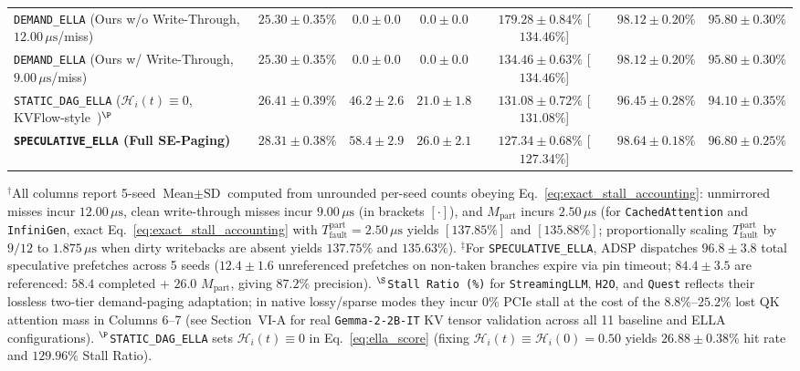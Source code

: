 \documentclass[conference,10pt]{IEEEtran}
\begin{document}
\begin{table}[t]
{\begin{tabular}{@{}lcccccc@{}}
\texttt{DEMAND\_ELLA} (Ours w/o Write-Through, $12.00\,\mu\text{s}$/miss) & $25.30 \pm 0.35\%$ & $0.0 \pm 0.0$ & $0.0 \pm 0.0$ & $179.28 \pm 0.84\%$ [$134.46\%$] & $98.12 \pm 0.20\%$ & $95.80 \pm 0.30\%$ \\
\texttt{DEMAND\_ELLA} (Ours w/ Write-Through, $9.00\,\mu\text{s}$/miss) & $25.30 \pm 0.35\%$ & $0.0 \pm 0.0$ & $0.0 \pm 0.0$ & $134.46 \pm 0.63\%$ [$134.46\%$] & $98.12 \pm 0.20\%$ & $95.80 \pm 0.30\%$ \\
\texttt{STATIC\_DAG\_ELLA} ($\mathcal{H}_i(t)\equiv 0$, KVFlow-style~\cite{pan2025kvflow})$^\P$ & $26.41 \pm 0.39\%$ & $46.2 \pm 2.6$ & $21.0 \pm 1.8$ & $131.08 \pm 0.72\%$ [$131.08\%$] & $96.45 \pm 0.28\%$ & $94.10 \pm 0.35\%$ \\
\textbf{\texttt{SPECULATIVE\_ELLA} (Full SE-Paging)} & $\mathbf{28.31 \pm 0.38\%}$ & $\mathbf{58.4 \pm 2.9}$ & $\mathbf{26.0 \pm 2.1}$ & $\mathbf{127.34 \pm 0.68\%}$ [$\mathbf{127.34\%}$] & $\mathbf{98.64 \pm 0.18\%}$ & $\mathbf{96.80 \pm 0.25\%}$ \\
\bottomrule
\end{tabular}%
}
\vspace{2pt}
\begin{minipage}{\textwidth}
\footnotesize
$^\dagger$All columns report 5-seed $\text{Mean} \pm \text{SD}$ computed from unrounded per-seed counts obeying Eq.~\eqref{eq:exact_stall_accounting}: unmirrored misses incur $12.00\,\mu\text{s}$, clean write-through misses incur $9.00\,\mu\text{s}$ (in brackets $[\cdot]$), and $M_{\text{part}}$ incurs $2.50\,\mu\text{s}$ (for \texttt{CachedAttention} and \texttt{InfiniGen}, exact Eq.~\eqref{eq:exact_stall_accounting} with $T_{\text{fault}}^{\text{part}} = 2.50\,\mu\text{s}$ yields $[137.85\%]$ and $[135.88\%]$; proportionally scaling $T_{\text{fault}}^{\text{part}}$ by $9/12$ to $1.875\,\mu\text{s}$ when dirty writebacks are absent yields $137.75\%$ and $135.63\%$). $^\ddagger$For \texttt{SPECULATIVE\_ELLA}, ADSP dispatches $96.8 \pm 3.8$ total speculative prefetches across 5 seeds ($12.4 \pm 1.6$ unreferenced prefetches on non-taken branches expire via pin timeout; $84.4 \pm 3.5$ are referenced: $58.4$ completed + $26.0$ $M_{\text{part}}$, giving $87.2\%$ precision). $^\S$\texttt{Stall Ratio (\%)} for \texttt{StreamingLLM}, \texttt{H2O}, and \texttt{Quest} reflects their lossless two-tier demand-paging adaptation; in native lossy/sparse modes they incur $0\%$ PCIe stall at the cost of the $8.8\%\text{--}25.2\%$ lost QK attention mass in Columns 6--7 (see Section~VI-A for real \texttt{Gemma-2-2B-IT} KV tensor validation across all 11 baseline and ELLA configurations). $^\P$\texttt{STATIC\_DAG\_ELLA} sets $\mathcal{H}_i(t)\equiv 0$ in Eq.~\eqref{eq:ella_score} (fixing $\mathcal{H}_i(t)\equiv \mathcal{H}_i(0)=0.50$ yields $26.88 \pm 0.38\%$ hit rate and $129.96\%$ Stall Ratio).
\end{minipage}
\end{table}
\end{document}
